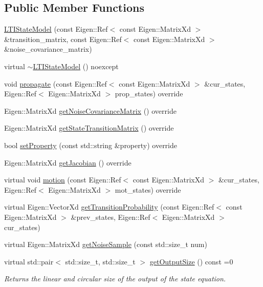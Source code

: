 \subsection*{Public Member Functions}
\begin{DoxyCompactItemize}
\item 
\mbox{\hyperlink{classbfl_1_1LTIStateModel_afac0939d317f9e871fd943f7eeddd898}{L\+T\+I\+State\+Model}} (const Eigen\+::\+Ref$<$ const Eigen\+::\+Matrix\+Xd $>$ \&transition\+\_\+matrix, const Eigen\+::\+Ref$<$ const Eigen\+::\+Matrix\+Xd $>$ \&noise\+\_\+covariance\+\_\+matrix)
\item 
virtual \mbox{\hyperlink{classbfl_1_1LTIStateModel_afd7c1759715a3b684eaae37223175e3d}{$\sim$\+L\+T\+I\+State\+Model}} () noexcept
\item 
void \mbox{\hyperlink{classbfl_1_1LTIStateModel_a0a736ef66903c2e598f0b86892a716aa}{propagate}} (const Eigen\+::\+Ref$<$ const Eigen\+::\+Matrix\+Xd $>$ \&cur\+\_\+states, Eigen\+::\+Ref$<$ Eigen\+::\+Matrix\+Xd $>$ prop\+\_\+states) override
\item 
Eigen\+::\+Matrix\+Xd \mbox{\hyperlink{classbfl_1_1LTIStateModel_a60a5ab5f3013b771ddd73787edd8dcde}{get\+Noise\+Covariance\+Matrix}} () override
\item 
Eigen\+::\+Matrix\+Xd \mbox{\hyperlink{classbfl_1_1LTIStateModel_a65d486fe684ebbd4970391809ccf2bd9}{get\+State\+Transition\+Matrix}} () override
\item 
bool \mbox{\hyperlink{classbfl_1_1LTIStateModel_afc2264780111fe41b6a82e97bcb5e87c}{set\+Property}} (const std\+::string \&property) override
\item 
Eigen\+::\+Matrix\+Xd \mbox{\hyperlink{classbfl_1_1LTIStateModel_a5bdef1421c100bce7baa1961d2916fc3}{get\+Jacobian}} () override
\item 
virtual void \mbox{\hyperlink{classbfl_1_1AdditiveStateModel_a9f145bf8c592fc0092d84421f26dbb8b}{motion}} (const Eigen\+::\+Ref$<$ const Eigen\+::\+Matrix\+Xd $>$ \&cur\+\_\+states, Eigen\+::\+Ref$<$ Eigen\+::\+Matrix\+Xd $>$ mot\+\_\+states) override
\item 
virtual Eigen\+::\+Vector\+Xd \mbox{\hyperlink{classbfl_1_1StateModel_acb582cb7d41ec7b854ed1dbd8965b6fc}{get\+Transition\+Probability}} (const Eigen\+::\+Ref$<$ const Eigen\+::\+Matrix\+Xd $>$ \&prev\+\_\+states, Eigen\+::\+Ref$<$ Eigen\+::\+Matrix\+Xd $>$ cur\+\_\+states)
\item 
virtual Eigen\+::\+Matrix\+Xd \mbox{\hyperlink{classbfl_1_1StateModel_acc6733af2dcba2a330bf7c59c3725e42}{get\+Noise\+Sample}} (const std\+::size\+\_\+t num)
\item 
virtual std\+::pair$<$ std\+::size\+\_\+t, std\+::size\+\_\+t $>$ \mbox{\hyperlink{classbfl_1_1StateModel_a6bf680b689389d959fc9ac46595e6dab}{get\+Output\+Size}} () const =0
\begin{DoxyCompactList}\small\item\em Returns the linear and circular size of the output of the state equation. \end{DoxyCompactList}\end{DoxyCompactItemize}
